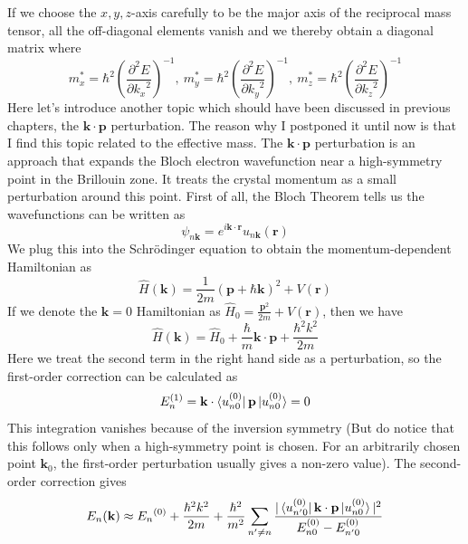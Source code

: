 \documentclass{article}
\begin{document}
If we choose the $x,y,z$-axis carefully to be the major axis of the reciprocal mass tensor, all the off-diagonal elements vanish and we thereby obtain a diagonal matrix where\begin{equation}
    m^*_x=\hbar^2(\frac{\partial^2E}{\partial{k_x}^2})^{-1},~m^*_y=\hbar^2(\frac{\partial^2E}{\partial{k_y}^2})^{-1},~m^*_z=\hbar^2(\frac{\partial^2E}{\partial{k_z}^2})^{-1}
\end{equation}Here let's introduce another topic which should have been discussed in previous chapters, the $\mathbf{k}\cdot\mathbf{p}$ perturbation. The reason why I postponed it until now is that I find this topic related to the effective mass. The $\mathbf{k}\cdot\mathbf{p}$ perturbation is an approach that expands the Bloch electron wavefunction near a high-symmetry point in the Brillouin zone. It treats the crystal momentum as a small perturbation around this point. First of all, the Bloch Theorem tells us the wavefunctions can be written as\begin{equation}
    \psi_{n\mathbf{k}}=e^{i\mathbf{k}\cdot\mathbf{r}}u_{n\mathbf{k}}(\mathbf{r})
\end{equation}We plug this into the Schr\"odinger equation to obtain the momentum-dependent Hamiltonian as\begin{equation}
    \hat{H}(\mathbf{k})=\frac{1}{2m}(\mathbf{p}+\hbar\mathbf{k})^2+V(\mathbf{r})
\end{equation}If we denote the $\mathbf{k}=0$ Hamiltonian as $\hat{H}_0=\frac{\mathbf{p}^2}{2m}+V(\mathbf{r})$, then we have\begin{equation}
    \hat{H}(\mathbf{k})=\hat{H}_0+\frac{\hbar}{m}\mathbf{k}\cdot\mathbf{p}+\frac{\hbar^2k^2}{2m}
\end{equation}Here we treat the second term in the right hand side as a perturbation, so the first-order correction can be calculated as\begin{equation}
    E_n^{(1)}=\mathbf{k}\cdot\bra{u_{n0}^{(0)}}\mathbf{p}\ket{u_{n0}^{(0)}}=0
\end{equation}This integration vanishes because of the inversion symmetry (But do notice that this follows only when a high-symmetry point is chosen. For an arbitrarily chosen point $\mathbf{k}_0$, the first-order perturbation usually gives a non-zero value). The second-order correction gives\begin{equation}
    E_n(\mathbf{k})\approx{E_n}^{(0)}+\frac{\hbar^2k^2}{2m}+\frac{\hbar^2}{m^2}\sum_{n'\neq{n}}\frac{|\bra{u_{n'0}^{(0)}}\mathbf{k}\cdot\mathbf{p}\ket{u_{n0}^{(0)}}|^2}{E_{n0}^{(0)}-E_{n'0}^{(0)}}

\end{equation}
\end{document}
